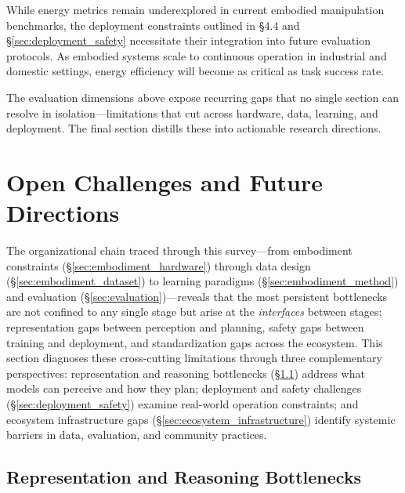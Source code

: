 \documentclass[acmsmall,screen,review,anonymous]{acmart}
\begin{document}
While energy metrics remain underexplored in current embodied manipulation benchmarks, the deployment constraints outlined in \S4.4 and \S\ref{sec:deployment_safety} necessitate their integration into future evaluation protocols. As embodied systems scale to continuous operation in industrial and domestic settings, energy efficiency will become as critical as task success rate.

The evaluation dimensions above expose recurring gaps that no single section can resolve in isolation---limitations that cut across hardware, data, learning, and deployment. The final section distills these into actionable research directions.

\section{Open Challenges and Future Directions}\label{sec:challenges}

The organizational chain traced through this survey---from embodiment constraints (\S\ref{sec:embodiment_hardware}) through data design (\S\ref{sec:embodiment_dataset}) to learning paradigms (\S\ref{sec:embodiment_method}) and evaluation (\S\ref{sec:evaluation})---reveals that the most persistent bottlenecks are not confined to any single stage but arise at the \emph{interfaces} between stages: representation gaps between perception and planning, safety gaps between training and deployment, and standardization gaps across the ecosystem. This section diagnoses these cross-cutting limitations through three complementary perspectives: representation and reasoning bottlenecks (\S\ref{sec:representation_reasoning}) address what models can perceive and how they plan; deployment and safety challenges (\S\ref{sec:deployment_safety}) examine real-world operation constraints; and ecosystem infrastructure gaps (\S\ref{sec:ecosystem_infrastructure}) identify systemic barriers in data, evaluation, and community practices.

\subsection{Representation and Reasoning Bottlenecks}\label{sec:representation_reasoning}
\end{document}
